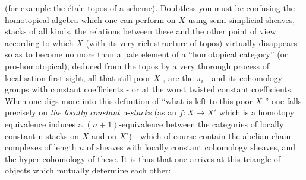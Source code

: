 
(for example the étale topos of a scheme). Doubtless you must be confusing
the homotopical algebra which one can perform on $X$ \over{;}{\unsure{,}} using semi-simplicial
sheaves,  stacks of all kinds, the relations between these \inserted{-} and the other
point of view according to which $X$ (with its very rich structure of topos)
virtually disappears so as to become no more than a pale element of a
``homotopical category'' (or pro-homotopical), deduced from the topos by a
very thorough process of localisation   first sight, all that still
 poor  $X$ , are the $\pi_i$ - and its cohomology groups with constant
coefficients - or at the worst twisted constant coefficients. When one digs
more into this definition of ``what is left to this poor $X$ '' one falls
precisely on \textit{the locally constant} n-\textit{stacks} (as an $f : X \to X'$ which is a
homotopy equivalence induces a $(n + 1)$-equivalence between the categories
of locally constant n-stacks on $X$ and on $X'$) - which of course contain
the abelian chain complexes of length $n$ of sheaves with locally constant
cohomology sheaves, and the hyper-cohomology of these. It is thus that one
arrives at this triangle of objects which mutually determine each other:


